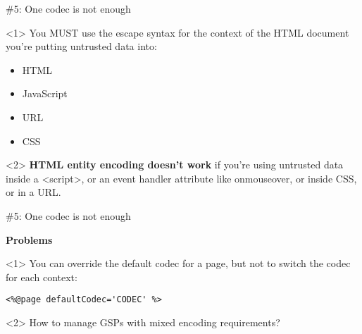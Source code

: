 \begin{frame}

    \vspace{.5cm}

    \begin{center}
      \Huge\color{red} \#5: One codec is not enough
    \end{center}

    \vspace{1cm}

    \begin{onlyenv}<1>
      You MUST use the escape syntax for the context of the HTML document you're putting untrusted data into:
      \begin{itemize}
        \item HTML
        \item JavaScript
        \item URL
        \item CSS
      \end{itemize}
    \end{onlyenv}

    \begin{onlyenv}<2>
      \textbf{HTML entity encoding doesn't work} if you're using untrusted data inside a <script>, or an event handler attribute like onmouseover, or inside CSS, or in a URL.
    \end{onlyenv}

\end{frame}


\begin{frame}

    \vspace{.5cm}

    \begin{center}
      \Huge\color{red} \#5: One codec is not enough
    \end{center}

    \vspace{1cm}

    \Large
    \textbf{Problems} \\[1em]

    \begin{onlyenv}<1>
      You can override the default codec for a page, but not to switch the codec for each context:
      \begin{center}
        \begin{minipage}{.9\textwidth}
          \begin{verbatim}
<%@page defaultCodec='CODEC' %>
          \end{verbatim}
        \end{minipage}
      \end{center}
    \end{onlyenv}

    \begin{onlyenv}<2>
      How to manage GSPs with mixed encoding requirements?
    \end{onlyenv}

    \vfill

\end{frame}


